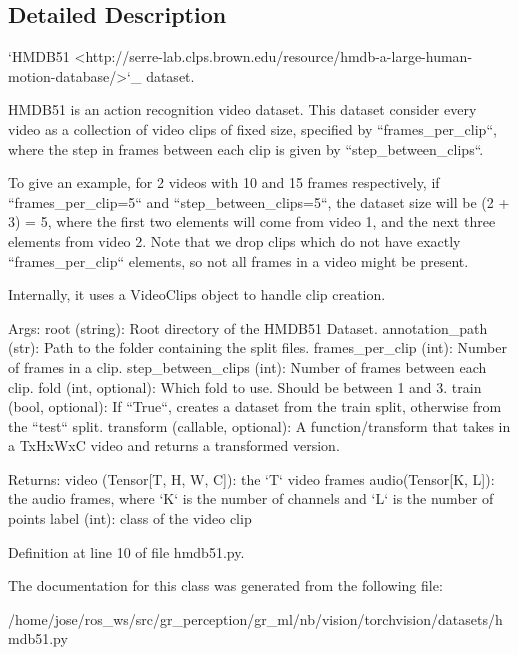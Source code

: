 \subsection{Detailed Description}
\begin{DoxyVerb}`HMDB51 <http://serre-lab.clps.brown.edu/resource/hmdb-a-large-human-motion-database/>`_
dataset.

HMDB51 is an action recognition video dataset.
This dataset consider every video as a collection of video clips of fixed size, specified
by ``frames_per_clip``, where the step in frames between each clip is given by
``step_between_clips``.

To give an example, for 2 videos with 10 and 15 frames respectively, if ``frames_per_clip=5``
and ``step_between_clips=5``, the dataset size will be (2 + 3) = 5, where the first two
elements will come from video 1, and the next three elements from video 2.
Note that we drop clips which do not have exactly ``frames_per_clip`` elements, so not all
frames in a video might be present.

Internally, it uses a VideoClips object to handle clip creation.

Args:
    root (string): Root directory of the HMDB51 Dataset.
    annotation_path (str): Path to the folder containing the split files.
    frames_per_clip (int): Number of frames in a clip.
    step_between_clips (int): Number of frames between each clip.
    fold (int, optional): Which fold to use. Should be between 1 and 3.
    train (bool, optional): If ``True``, creates a dataset from the train split,
        otherwise from the ``test`` split.
    transform (callable, optional): A function/transform that takes in a TxHxWxC video
        and returns a transformed version.

Returns:
    video (Tensor[T, H, W, C]): the `T` video frames
    audio(Tensor[K, L]): the audio frames, where `K` is the number of channels
        and `L` is the number of points
    label (int): class of the video clip
\end{DoxyVerb}
 

Definition at line 10 of file hmdb51.\+py.



The documentation for this class was generated from the following file\+:\begin{DoxyCompactItemize}
\item 
/home/jose/ros\+\_\+ws/src/gr\+\_\+perception/gr\+\_\+ml/nb/vision/torchvision/datasets/hmdb51.\+py\end{DoxyCompactItemize}

